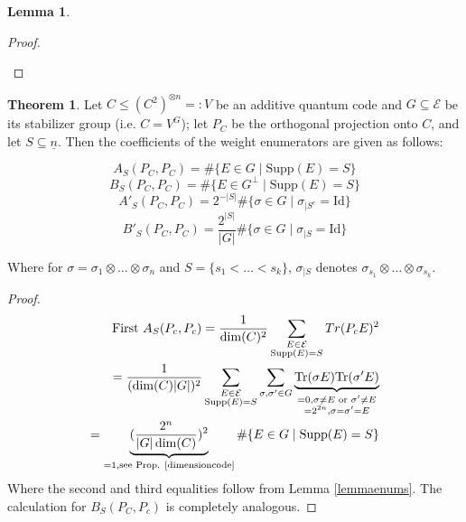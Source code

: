 \documentclass[12pt,a4paper,BCOR15mm,twoside,DIV12]{article}
\def\supp{\text{Supp}}
\def\n{\underline{n}}
\def\Tr{\text{Tr}}
\def\Id{\text{Id}}
\newenvironment{bew}{\begin{proof}[Proof]}{\end{proof}}
\theoremstyle{definition}
\newtheorem{theorem}[Satz]{Theorem}
\newtheorem{lem}[Satz]{Lemma}
\begin{document}
\begin{lem}
\begin{bew}
\begin{enumerate}
\end{enumerate}
\end{bew}
\end{lem}

\begin{theorem}\label{coeffsadditive}
Let $C \leq (C^2)^{\otimes n} =: V$ be an additive quantum code and $G \subseteq \mathcal{E}$ be its stabilizer group (i.e. $C = V^G$); let $P_C$ be the orthogonal projection onto $C$, and let $S \subseteq \n$. Then the coefficients of the weight enumerators are given as follows:

\begin{equation} A_S(P_C,P_C) = \# \{ E \in G \mid \supp(E) = S \} \end{equation}
\begin{equation} B_S(P_C,P_C) = \# \{ E \in G^\perp \mid \supp(E) = S \} \end{equation}
\begin{equation} A'_S(P_C,P_C) = 2^{-|S|} \# \{ \sigma \in G \mid \sigma_{\big| S^c} = \Id \} \end{equation}
\begin{equation} B'_S(P_C,P_C) = \frac{2^{|S|}}{|G|} \# \{ \sigma \in G \mid \sigma_{\big| S} = \Id \} \end{equation}

Where for $ \sigma = \sigma_1 \otimes \ldots \otimes \sigma_n$ and $S = \{ s_1 < \ldots < s_k \}$, $\sigma_{\big| S}$ denotes $\sigma_{s_1} \otimes \ldots \otimes \sigma_{s_k}$.

\begin{proof}
\begin{align*} \text{First } A_S(P_c,P_c) = \frac{1}{\dim(C)^2} \sum_{\substack{E \in \mathcal{E} \\ \supp(E) = S}} Tr(P_c E)^2 \\ = \frac{1}{(\dim(C)|G|)^2} \sum_{\substack{E \in \mathcal{E} \\ \supp(E) = S}} \sum_{\sigma,\sigma' \in G} \underbrace{ \Tr(\sigma E) \Tr(\sigma' E)}_{\substack{=0, \sigma \neq E \text{ or } \sigma' \neq E \\ =2^{2n}, \sigma = \sigma' = E}} 
\\ = \underbrace{(\frac{2^n}{ |G| \dim (C)})^2 }_{ = 1, \text{see Prop. \ref{dimensioncode}}} \# \{ E \in G \mid \supp(E) = S \} \end{align*}
Where the second and third equalities follow from Lemma \ref{lemmaenums}. The calculation for $B_S(P_C,P_c)$ is completely analogous.


\end{proof}
\end{theorem}
\end{document}
